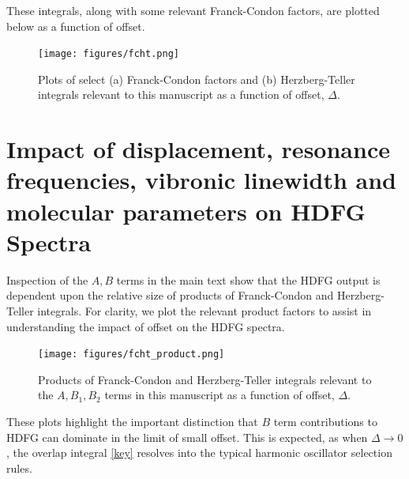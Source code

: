 \documentclass[aip, jcp, reprint, onecolumn, nofootinbib]{revtex4-2}
\begin{document}
These integrals, along with some relevant Franck-Condon factors, are plotted below as a function of offset. 

\begin{figure}[!htbp]
	\centering
	\texttt{[image: figures/fcht.png]}
	\caption{Plots of select (a) Franck-Condon factors and (b) Herzberg-Teller integrals relevant to this manuscript as a function of offset, $\Delta$.} 
	\label{fig:fcht}
\end{figure}


\newpage
\section{Impact of displacement, resonance frequencies, vibronic linewidth and molecular parameters on HDFG Spectra}
Inspection of the $A,B$ terms in the main text show that the HDFG output is dependent upon the relative size of products of Franck-Condon and Herzberg-Teller integrals.
For clarity, we plot the relevant product factors to assist in understanding the impact of offset on the HDFG spectra.

\begin{figure}[!htbp]
	\centering
	\texttt{[image: figures/fcht\_product.png]}
	\caption{Products of Franck-Condon and Herzberg-Teller integrals relevant to the $A, B_1, B_2$ terms in this manuscript as a function of offset, $\Delta$.} 
	\label{fig:fcht_product}
\end{figure}

These plots highlight the important distinction that $B$ term contributions to HDFG can dominate in the limit of small offset.
This is expected, as when $\Delta \rightarrow 0$, the overlap integral \autoref{key} resolves into the typical harmonic oscillator selection rules.
\end{document}
